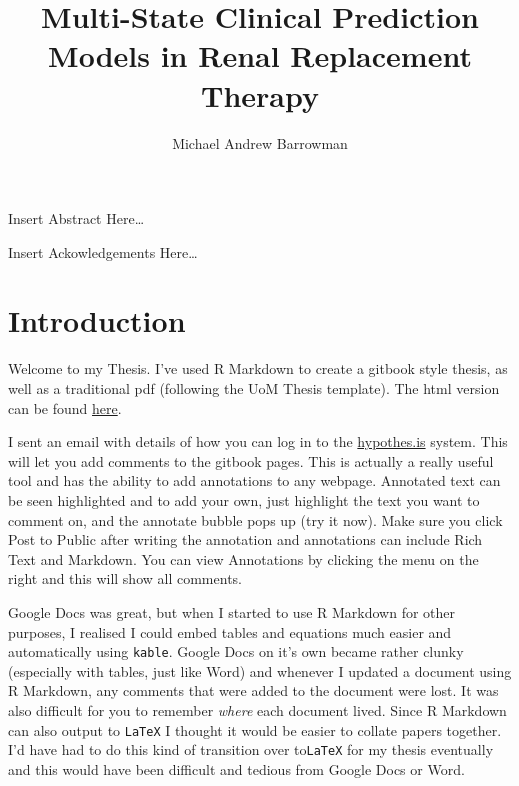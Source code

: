 \documentclass[12pt,PhD,twoside,openright]{muthesis}
\begin{document}
\title{Multi-State Clinical Prediction Models in Renal Replacement Therapy}
\author{Michael Andrew Barrowman}
\principaladviser{}
\faculty{}
\school{}
\beforeabstract

Insert Abstract Here\ldots{}

\afterabstract


\begingroup

\setlength{\parskip}{15pt}
\setlength{\parindent}{0pt}
Insert Ackowledgements Here\ldots{}

\par
\endgroup
\afterpreface

\hypertarget{introduction}{%
\chapter*{Introduction}\label{introduction}}

Welcome to my Thesis. I've used R Markdown to create a gitbook style thesis, as well as a traditional pdf (following the UoM Thesis template). The html version can be found \href{https://michaelbarrowman.co.uk/thesis}{here}.

I sent an email with details of how you can log in to the \href{https://hypothes.is/}{hypothes.is} system. This will let you add comments to the gitbook pages. This is actually a really useful tool and has the ability to add annotations to any webpage. Annotated text can be seen highlighted and to add your own, just highlight the text you want to comment on, and the annotate bubble pops up (try it now). Make sure you click Post to Public after writing the annotation and annotations can include Rich Text and Markdown. You can view Annotations by clicking the menu on the right and this will show all comments.

Google Docs was great, but when I started to use R Markdown for other purposes, I realised I could embed tables and equations much easier and automatically using \texttt{kable}. Google Docs on it's own became rather clunky (especially with tables, just like Word) and whenever I updated a document using R Markdown, any comments that were added to the document were lost. It was also difficult for you to remember \emph{where} each document lived. Since R Markdown can also output to \texttt{LaTeX} I thought it would be easier to collate papers together. I'd have had to do this kind of transition over to\texttt{LaTeX} for my thesis eventually and this would have been difficult and tedious from Google Docs or Word.
\end{document}

